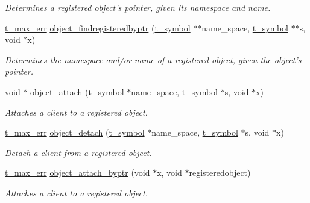 \begin{DoxyCompactItemize}
\begin{DoxyCompactList}\small\item\em Determines a registered object's pointer, given its namespace and name. \item\end{DoxyCompactList}\item 
\hyperlink{group__datatypes_ga73edaae82b318855cc09fac994918165}{t\_\-max\_\-err} \hyperlink{group__obj_gadeb570bcae0e9bbf389d571e85d16bfa}{object\_\-findregisteredbyptr} (\hyperlink{structt__symbol}{t\_\-symbol} $\ast$$\ast$name\_\-space, \hyperlink{structt__symbol}{t\_\-symbol} $\ast$$\ast$s, void $\ast$x)
\begin{DoxyCompactList}\small\item\em Determines the namespace and/or name of a registered object, given the object's pointer. \item\end{DoxyCompactList}\item 
void $\ast$ \hyperlink{group__obj_ga42025069e4317aef6dbe5c21c316fd85}{object\_\-attach} (\hyperlink{structt__symbol}{t\_\-symbol} $\ast$name\_\-space, \hyperlink{structt__symbol}{t\_\-symbol} $\ast$s, void $\ast$x)
\begin{DoxyCompactList}\small\item\em Attaches a client to a registered object. \item\end{DoxyCompactList}\item 
\hyperlink{group__datatypes_ga73edaae82b318855cc09fac994918165}{t\_\-max\_\-err} \hyperlink{group__obj_ga6765e9533a3ae0d67d302f1e038c66ac}{object\_\-detach} (\hyperlink{structt__symbol}{t\_\-symbol} $\ast$name\_\-space, \hyperlink{structt__symbol}{t\_\-symbol} $\ast$s, void $\ast$x)
\begin{DoxyCompactList}\small\item\em Detach a client from a registered object. \item\end{DoxyCompactList}\item 
\hyperlink{group__datatypes_ga73edaae82b318855cc09fac994918165}{t\_\-max\_\-err} \hyperlink{group__obj_ga76657298bcd43ae4f9098e3ed2b97c72}{object\_\-attach\_\-byptr} (void $\ast$x, void $\ast$registeredobject)
\begin{DoxyCompactList}\small\item\em Attaches a client to a registered object. \item\end{DoxyCompactList}\item 

\end{DoxyCompactItemize}
